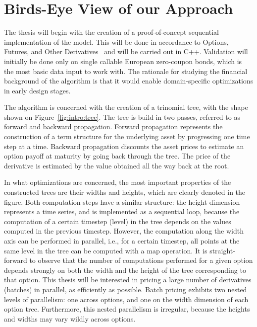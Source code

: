 \section{Birds-Eye View of our Approach}
\label{section:solution}
The thesis will begin with the creation of a proof-of-concept sequential implementation of the model. This will be done in accordance to Options, Futures, and Other Derivatives~\cite{ofod} and will be carried out in C++. Validation will initially be done only on single callable European zero-coupon bonds, which is the most basic data input to work with. The rationale for studying the financial background of the  algorithm is that it would enable domain-specific optimizations in early design stages.

The algorithm is concerned with the creation of a trinomial tree, with the shape shown on Figure~\ref{fig:intro:tree}. The tree is build in two passes, referred to as forward and backward propagation. Forward propagation represents the construction of a term structure for the underlying asset by progressing one time step at a time. Backward propagation discounts the asset prices to estimate an option payoff at maturity by going back through the tree. The price of the derivative is estimated by the value obtained all the way back at the root. 

In what optimizations are concerned, the most important properties of the constructed trees are their widths and heights, which are clearly denoted in the figure. Both computation steps have a similar structure: the height dimension represents a time series, and is implemented as a sequential loop, because the computation of a certain timestep (level) in the tree depends on the values computed in the previous timestep. However, the computation along the width axis can be performed in parallel, i.e., for a certain timestep, all points at the same level in the tree can be computed with a map operation. 
%
%
It is straight-forward to observe that the number of computations performed for a given option depends strongly on both the width and the height of the tree corresponding to that option. This thesis will be interested in pricing a large number of derivatives (batches) in parallel, as efficiently as possible. Batch pricing exhibits two nested levels of parallelism: one across options, and one on the width dimension of each option tree.   Furthermore, this nested parallelism is irregular, because the heights and widths may vary wildly across options. 

